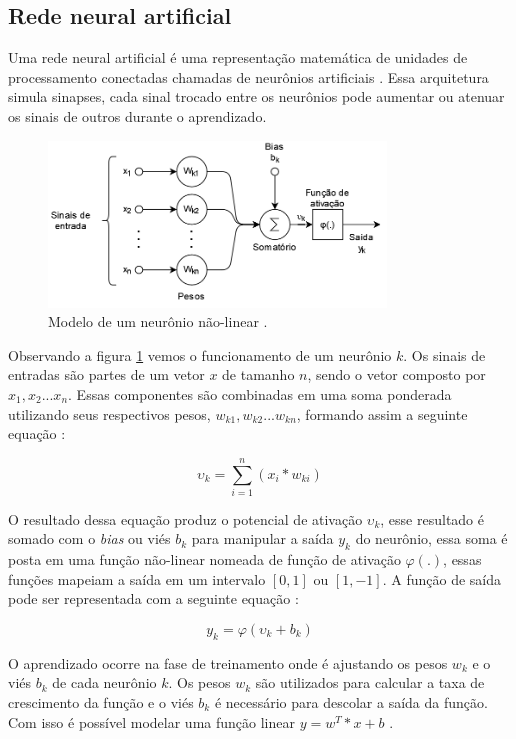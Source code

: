 \subsection{Rede neural artificial}

Uma rede neural artificial é uma representação matemática de unidades de processamento conectadas chamadas de neurônios artificiais . Essa arquitetura simula sinapses, cada sinal trocado entre os neurônios pode aumentar ou atenuar os sinais de outros durante o aprendizado\cite{ml_and_dp}.
\begin{figure}[H]
	\centering
	\includegraphics[width=0.8\textwidth]{figures/neuronio.png}
	\caption{Modelo de um neurônio não-linear \cite{haykin1999neural}.}
	\label{fig:neuronio}
\end{figure}

Observando a figura \ref{fig:neuronio} vemos o funcionamento de um neurônio $k$. Os sinais de entradas são partes de um vetor $x$ de tamanho $n$, sendo o vetor composto por $x_1, x_2 ... x_n$. Essas componentes são combinadas em uma soma ponderada utilizando seus respectivos pesos, $w_{k1}, w_{k2}...w_{kn}$, formando assim a seguinte equação  :

$$\upsilon_k = \sum_{i=1}^n (x_i * w_{ki})$$

O resultado dessa equação produz o potencial de ativação $\upsilon_k$, esse resultado é somado com o \textit{bias} ou viés $b_k$ para manipular a saída $y_k$ do neurônio, essa soma é posta em uma função não-linear nomeada de função de ativação $\varphi(.)$, essas funções mapeiam a saída em um intervalo $[0, 1]$ ou $[1, -1]$. A função de saída pode ser representada com a seguinte equação :

$$y_k = \varphi(\upsilon_k + b_k)$$

O aprendizado ocorre na fase de treinamento onde é ajustando os pesos $w_k$ e o viés $b_k$ de cada neurônio $k$. Os pesos $w_k$ são utilizados para calcular a taxa de crescimento da função e o viés $b_k$ é necessário para descolar a saída da função. Com isso é possível modelar uma função linear $y=w^T*x+b$ \cite{marti2017aprendizado}.

